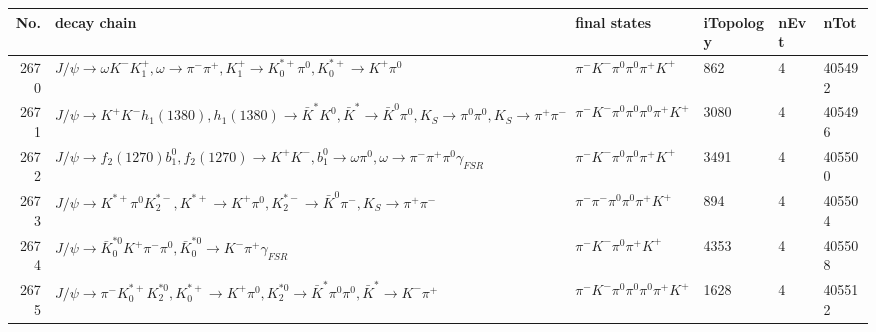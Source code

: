 \begin{table}[htbp] 
\begin{center}
\begin{small}
\begin{tabular}{rlllll}\hline\hline
 No. & decay chain & final states &  iTopology & nEvt & nTot \\\hline
2670&$J/\psi       \rightarrow \omega         K^{-}          K_1^{+}        , \omega          \rightarrow \pi^{-}        \pi^{+}        , K_1^{+}         \rightarrow K_{0}^{*+}     \pi^{0}        , K_{0}^{*+}      \rightarrow K^{+}          \pi^{0}        $&$\pi^{-}        K^{-}          \pi^{0}        \pi^{0}        \pi^{+}        K^{+}          $&  862&    4&405492\\
2671&$J/\psi       \rightarrow K^{+}          K^{-}          h_{1}(1380)    , h_{1}(1380)     \rightarrow \bar{K}^{*}   K^{0}          , \bar{K}^{*}    \rightarrow \bar{K}^{0}   \pi^{0}        , K_{S}           \rightarrow \pi^{0}        \pi^{0}        , K_{S}           \rightarrow \pi^{+}        \pi^{-}        $&$\pi^{-}        K^{-}          \pi^{0}        \pi^{0}        \pi^{0}        \pi^{+}        K^{+}          $& 3080&    4&405496\\
2672&$J/\psi       \rightarrow f_{2}(1270)    b_{1}^{0}      , f_{2}(1270)     \rightarrow K^{+}          K^{-}          , b_{1}^{0}       \rightarrow \omega         \pi^{0}        , \omega          \rightarrow \pi^{-}        \pi^{+}        \pi^{0}        \gamma_{FSR} $&$\pi^{-}        K^{-}          \pi^{0}        \pi^{0}        \pi^{+}        K^{+}          $& 3491&    4&405500\\
2673&$J/\psi       \rightarrow K^{*+}         \pi^{0}        K_2^{*-}       , K^{*+}          \rightarrow K^{+}          \pi^{0}        , K_2^{*-}        \rightarrow \bar{K}^{0}   \pi^{-}        , K_{S}           \rightarrow \pi^{+}        \pi^{-}        $&$\pi^{-}        \pi^{-}        \pi^{0}        \pi^{0}        \pi^{+}        K^{+}          $&  894&    4&405504\\
2674&$J/\psi       \rightarrow \bar{K}_0^{*0}K^{+}          \pi^{-}        \pi^{0}        , \bar{K}_0^{*0} \rightarrow K^{-}          \pi^{+}        \gamma_{FSR} $&$\pi^{-}        K^{-}          \pi^{0}        \pi^{+}        K^{+}          $& 4353&    4&405508\\
2675&$J/\psi       \rightarrow \pi^{-}        K_{0}^{*+}     K_2^{*0}       , K_{0}^{*+}      \rightarrow K^{+}          \pi^{0}        , K_2^{*0}        \rightarrow \bar{K}^{*}   \pi^{0}        \pi^{0}        , \bar{K}^{*}    \rightarrow K^{-}          \pi^{+}        $&$\pi^{-}        K^{-}          \pi^{0}        \pi^{0}        \pi^{0}        \pi^{+}        K^{+}          $& 1628&    4&405512\\

\end{tabular}
\end{small}
\end{center}
\end{table}
